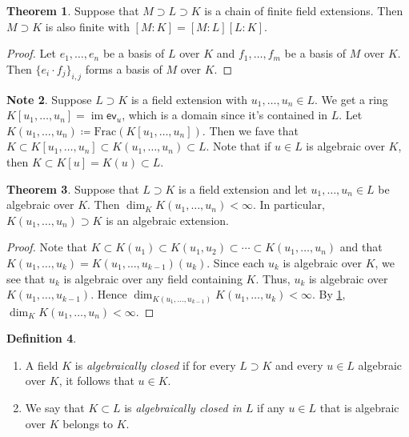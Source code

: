 \documentclass[10pt,letterpaper,cm]{nupset}
\theoremstyle{definition}
\newtheorem{definition}{Definition}[subsection]
\newtheorem{note}[definition]{Note}
\theoremstyle{theorem}
\newtheorem{theorem}[definition]{Theorem}
\theoremstyle{remark}
\newcommand{\1}{\mathbf{1}}
\newcommand{\0}{\vec 0}
\DeclareMathOperator{\im}{im}
\begin{document}
\begin{theorem}\label{lt}
Suppose that $M \supset L \supset K$ is a chain of finite field extensions. Then $M \supset K$ is also finite with $[M:K] = [M:L][L:K]$.
\end{theorem}
\begin{proof}
Let $e_1, \ldots, e_n$ be a basis of $L$ over $K$ and $f_1, \ldots, f_m$ be a basis of $M$ over $K$. Then $\{e_i\cdot f_j\}_{i,j}$ forms a basis of $M$ over $K$.
\end{proof}

\begin{note}
Suppose $L \supset K$ is a field extension with $u_1, \ldots, u_n \in L$. We get a ring $K[u_1, \ldots, u_n]= \im{\mathsf{ev}_u}$, which is a domain since it's contained in $L$. Let $K(u_1, \ldots, u_n) \coloneqq  \text{Frac}(K[u_1, \ldots, u_n])$. Then we fave that $K \subset K[u_1, \ldots, u_n] \subset K(u_1, \ldots, u_n) \subset L$. Note that if $u\in L$ is algebraic over $K$, then $K \subset K[u] = K(u) \subset L$. 
\end{note}

\begin{theorem}\label{ext}
Suppose that $L \supset K$ is a field extension and let $u_1, \ldots, u_n \in L$ be algebraic over $K$. Then $\dim_K{K(u_1, \ldots, u_n)} < \infty$. In particular, $K(u_1, \ldots, u_n) \supset K$ is an algebraic extension. 
\end{theorem}
\begin{proof}
Note that $K \subset K(u_1) \subset K(u_1, u_2) \subset \cdots \subset K(u_1, \ldots, u_n)$ and that $K(u_1, \ldots, u_k) = K(u_1, \ldots, u_{k-1})(u_k)$.  Since each $u_k$ is algebraic over $K$, we see that $u_k$ is algebraic over any field containing $K$. Thus, $u_k$ is algebraic over $K(u_1, \ldots, u_{k-1})$. Hence $\dim_{K(u_1, \ldots, u_{k-1})}{K(u_1, \ldots, u_k)} < \infty$. By \cref{lt}, $\dim_K{K(u_1, \ldots, u_n)} <\infty$.
\end{proof}

\begin{definition} $ $
\begin{enumerate}
\item A field $K$ is \textit{algebraically closed} if for every $L \supset K$ and every  $u\in L$ algebraic  over $K$, it follows that $u\in K$. 
\item We say that $K\subset L$ is \textit{algebraically closed in $L$} if any $u\in L$ that is algebraic over $K$ belongs to $K$. 
\end{enumerate}
\end{definition}
\end{document}

